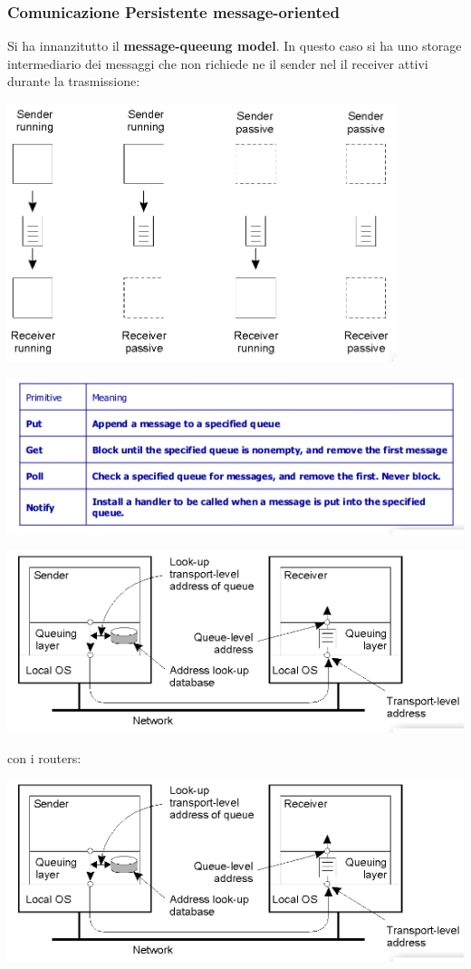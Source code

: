 \documentclass[a4paper,12pt, oneside]{book}
\begin{document}
\subsubsection{Comunicazione Persistente message-oriented}
Si ha innanzitutto il \textbf{message-queeung model}. In questo caso si ha uno storage intermediario dei messaggi che non richiede ne il sender nel il receiver attivi durante la trasmissione:
\begin{center}
	\includegraphics[scale=0.8]{img/que.png}
\end{center}
\begin{center}
	\includegraphics[scale=0.8]{img/queu2.png}
\end{center}
\begin{center}
	\includegraphics[scale=0.8]{img/queu3.png}
\end{center}
con i routers:
\begin{center}
	\includegraphics[scale=0.8]{img/queu3.png}
\end{center}
\end{document}
